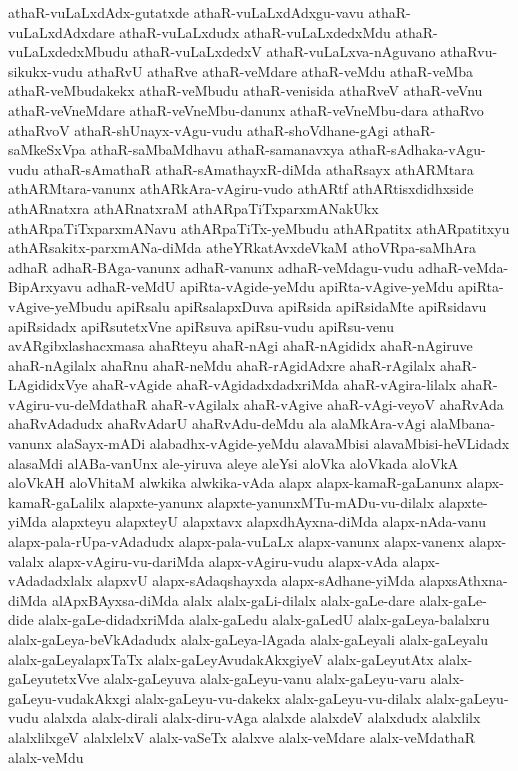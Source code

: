 {athaR-vuLaLxdAdx-gutatxde
athaR-vuLaLxdAdxgu-vavu
athaR-vuLaLxdAdxdare
athaR-vuLaLxdudx
athaR-vuLaLxdedxMdu
athaR-vuLaLxdedxMbudu
athaR-vuLaLxdedxV
athaR-vuLaLxva-nAguvano
athaRvu-sikukx-vudu
athaRvU
athaRve
athaR-veMdare
athaR-veMdu
athaR-veMba
athaR-veMbudakekx
athaR-veMbudu
athaR-venisida
athaRveV
athaR-veVnu
athaR-veVneMdare
athaR-veVneMbu-danunx
athaR-veVneMbu-dara
athaRvo
athaRvoV
athaR-shUnayx-vAgu-vudu
athaR-shoVdhane-gAgi
athaR-saMkeSxVpa
athaR-saMbaMdhavu
athaR-samanavxya
athaR-sAdhaka-vAgu-vudu
athaR-sAmathaR
athaR-sAmathayxR-diMda
athaRsayx
athARMtara
athARMtara-vanunx
athARkAra-vAgiru-vudo
athARtf
athARtisxdidhxside
athARnatxra
athARnatxraM
athARpaTiTxparxmANakUkx
athARpaTiTxparxmANavu
athARpaTiTx-yeMbudu
athARpatitx
athARpatitxyu
athARsakitx-parxmANa-diMda
atheYRkatAvxdeVkaM
athoVRpa-saMhAra
adhaR
adhaR-BAga-vanunx
adhaR-vanunx
adhaR-veMdagu-vudu
adhaR-veMda-BipArxyavu
adhaR-veMdU
apiRta-vAgide-yeMdu
apiRta-vAgive-yeMdu
apiRta-vAgive-yeMbudu
apiRsalu
apiRsalapxDuva
apiRsida
apiRsidaMte
apiRsidavu
apiRsidadx
apiRsutetxVne
apiRsuva
apiRsu-vudu
apiRsu-venu
avARgibxlashacxmasa
ahaRteyu
ahaR-nAgi
ahaR-nAgididx
ahaR-nAgiruve
ahaR-nAgilalx
ahaRnu
ahaR-neMdu
ahaR-rAgidAdxre
ahaR-rAgilalx
ahaR-LAgididxVye
ahaR-vAgide
ahaR-vAgidadxdadxriMda
ahaR-vAgira-lilalx
ahaR-vAgiru-vu-deMdathaR
ahaR-vAgilalx
ahaR-vAgive
ahaR-vAgi-veyoV
ahaRvAda
ahaRvAdadudx
ahaRvAdarU
ahaRvAdu-deMdu
ala
alaMkAra-vAgi
alaMbana-vanunx
alaSayx-mADi
alabadhx-vAgide-yeMdu
alavaMbisi
alavaMbisi-heVLidadx
alasaMdi
alABa-vanUnx
ale-yiruva
aleye
aleYsi
aloVka
aloVkada
aloVkA
aloVkAH
aloVhitaM
alwkika
alwkika-vAda
alapx
alapx-kamaR-gaLanunx
alapx-kamaR-gaLalilx
alapxte-yanunx
alapxte-yanunxMTu-mADu-vu-dilalx
alapxte-yiMda
alapxteyu
alapxteyU
alapxtavx
alapxdhAyxna-diMda
alapx-nAda-vanu
alapx-pala-rUpa-vAdadudx
alapx-pala-vuLaLx
alapx-vanunx
alapx-vanenx
alapx-valalx
alapx-vAgiru-vu-dariMda
alapx-vAgiru-vudu
alapx-vAda
alapx-vAdadadxlalx
alapxvU
alapx-sAdaqshayxda
alapx-sAdhane-yiMda
alapxsAthxna-diMda
alApxBAyxsa-diMda
alalx
alalx-gaLi-dilalx
alalx-gaLe-dare
alalx-gaLe-dide
alalx-gaLe-didadxriMda
alalx-gaLedu
alalx-gaLedU
alalx-gaLeya-balalxru
alalx-gaLeya-beVkAdadudx
alalx-gaLeya-lAgada
alalx-gaLeyali
alalx-gaLeyalu
alalx-gaLeyalapxTaTx
alalx-gaLeyAvudakAkxgiyeV
alalx-gaLeyutAtx
alalx-gaLeyutetxVve
alalx-gaLeyuva
alalx-gaLeyu-vanu
alalx-gaLeyu-varu
alalx-gaLeyu-vudakAkxgi
alalx-gaLeyu-vu-dakekx
alalx-gaLeyu-vu-dilalx
alalx-gaLeyu-vudu
alalxda
alalx-dirali
alalx-diru-vAga
alalxde
alalxdeV
alalxdudx
alalxlilx
alalxlilxgeV
alalxlelxV
alalx-vaSeTx
alalxve
alalx-veMdare
alalx-veMdathaR
alalx-veMdu
}
